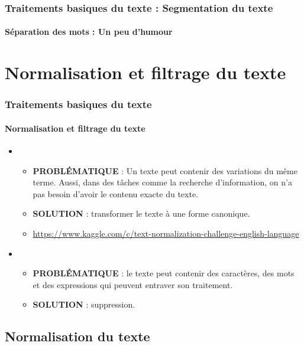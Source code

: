 \documentclass[xcolor=table]{beamer}
\begin{document}
\begin{frame}
\frametitle{Traitements basiques du texte : Segmentation du texte}
\framesubtitle{Séparation des mots : Un peu d'humour} 

\begin{center}
\end{center}

\end{frame}


\section{Normalisation et filtrage du texte}

\begin{frame}
\frametitle{Traitements basiques du texte}
\framesubtitle{Normalisation et filtrage du texte}

\begin{itemize}
	\item {}
	\begin{itemize}
		\item \textbf{PROBLÉMATIQUE} : Un texte peut contenir des variations du même terme. 
		Aussi, dans des tâches comme la recherche d'information, on n'a pas besoin d'avoir le contenu exacte du texte.
		\item \textbf{SOLUTION} : transformer le texte à une forme canonique.
		\item \url{https://www.kaggle.com/c/text-normalization-challenge-english-language}
	\end{itemize}
	\item {}
	\begin{itemize}
		\item \textbf{PROBLÉMATIQUE} : le texte peut contenir des caractères, des mots et des expressions qui peuvent entraver son traitement.
		\item \textbf{SOLUTION} : suppression.
	\end{itemize}
\end{itemize}

\end{frame}

\subsection{Normalisation du texte}
\end{document}
